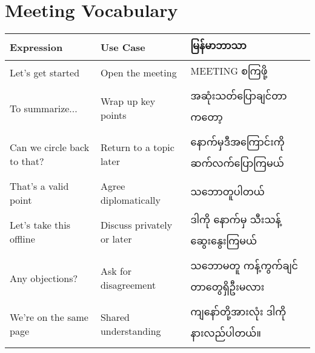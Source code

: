 \section{Meeting Vocabulary}
\begin{tabularx}{\textwidth}{|l|X|>{\raggedright\arraybackslash\burmesefont}p{5.5cm}|}
	\hline
	\textbf{Expression} & \textbf{Use Case} & \textbf{မြန်မာဘာသာ} \\
	\hline
	Let’s get started & Open the meeting & MEETING စကြဖို့ \\
	\hline
	To summarize... & Wrap up key points & အဆုံးသတ်ပြောချင်တာကတော့ \\
	\hline
	Can we circle back to that? & Return to a topic later & နောက်မှဒီအကြောင်းကို ဆက်လက်ပြောကြမယ် \\
	\hline
	That’s a valid point & Agree diplomatically & သဘောတူပါတယ် \\
	\hline
	Let’s take this offline & Discuss privately or later & ဒါကို နောက်မှ သီးသန့်ဆွေးနွေးကြမယ် \\
	\hline
	Any objections? & Ask for disagreement & သဘောမတူ ကန့်ကွက်ချင်တာတွေရှိဦးမလား \\
	\hline
	We’re on the same page & Shared understanding & ကျနော်တို့အားလုံး ဒါကိုနားလည်ပါတယ်။ \\
	\hline
\end{tabularx}